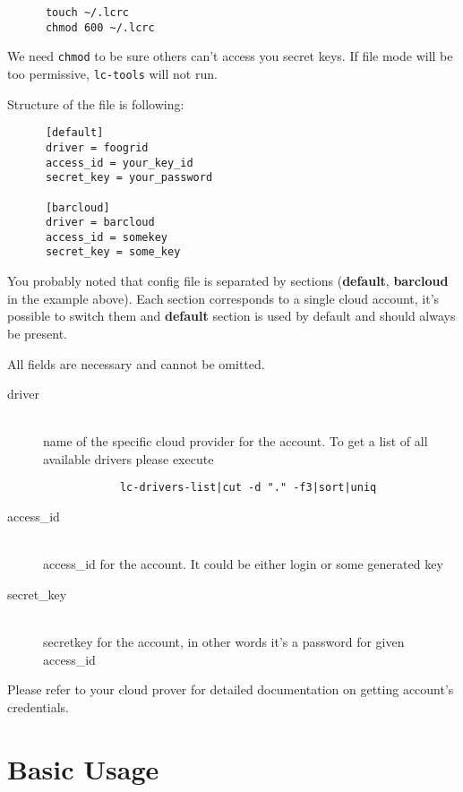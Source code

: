 \documentclass[a4paper]{report}
\begin{document}
      \begin{verbatim}
      touch ~/.lcrc
      chmod 600 ~/.lcrc
      \end{verbatim}

      We need {\tt chmod} to be sure others can't access you secret keys. If file mode
      will be too permissive, {\tt lc-tools} will not run.

      Structure of the file is following:

      \begin{verbatim}
      [default]
      driver = foogrid
      access_id = your_key_id
      secret_key = your_password

      [barcloud]
      driver = barcloud
      access_id = somekey
      secret_key = some_key
      \end{verbatim}

      You probably noted that config file is separated by sections (\textbf{default},
      \textbf{barcloud} in the example above). Each section corresponds to a single
      cloud account, it's possible to switch them and \textbf{default} section is
      used by default and should always be present.

      All fields are necessary and cannot be omitted.

      \begin{description}
        \item[driver] \hfill \\
          name of the specific cloud provider for the account. To get a list of all
          available drivers please execute

          \begin{verbatim}
            lc-drivers-list|cut -d "." -f3|sort|uniq
          \end{verbatim}

        \item[access\_id] \hfill \\
          access\_id for the account. It could be either login or some generated key
        \item[secret\_key] \hfill \\
          secretkey for the account, in other words it's a password for given access\_id
      \end{description}

      Please refer to your cloud prover for detailed documentation on getting account's
      credentials.

      \section{Basic Usage}
\end{document}
